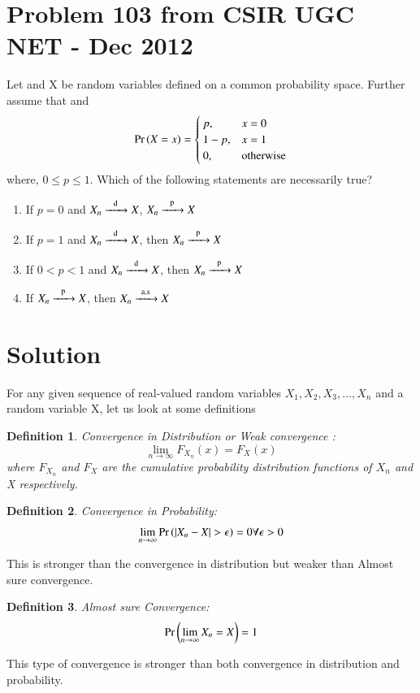 \documentclass[journal,12pt,twocolumn]{IEEEtran}
\newtheorem{definition}{Definition}
\begin{document}
\section{\textbf{Problem 103 from CSIR UGC NET - Dec 2012}}
Let  and X be random variables defined on a common probability space. Further assume that  and
 \begin{align}
\Pr\left(X = x\right) =\begin{cases}
    p, & x = 0  \\
    1-p, & x =1 \\
     0, &\text{otherwise} 
\end{cases}\end{align}
where, $0 \leq p \leq 1$. Which of the following statements are necessarily true?
\begin{enumerate}
    \item If $p = 0$ and $X_n \ce{->[d]} X$, $X_n \ce{->[p]} X$ 
    \item If $p = 1$ and $X_n \ce{->[d]} X$, then $X_n  \ce{->[p]} X$
    \item If $0<p<1$ and $X_n \ce{->[d]} X$, then $X_n \ce{->[p]} X$
    \item If $X_n \ce{->[p]} X$, then $X_n  \ce{->T[a.s]} X$
\end{enumerate}
\section{\textbf{Solution}}
For any given sequence of real-valued random variables $X_1,X_2,X_3, \dots ,X_n$ and a random variable X, let us look at some definitions
\begin{definition}{Convergence in Distribution or Weak convergence}
 \textbf{}:
    \begin{equation}
    \lim_{n \rightarrow \infty} F_{X_n}(x) = F_X(x)
\end{equation}
where $F_{X_n}$ and $F_X$ are the cumulative probability distribution functions of $X_n$ and X respectively.
\end{definition}
\begin{definition}{Convergence in Probability}:
    \begin{align}
    \lim_{n \rightarrow \infty} \Pr\left(|X_n - X| > \epsilon\right) = 0 \forall \epsilon > 0
\end{align}
\end{definition}
This is stronger than the convergence in distribution but weaker than Almost sure convergence.
\begin{definition}{Almost sure Convergence}:
    \begin{align}
  \Pr\left(\lim_{n \rightarrow \infty} X_n = X\right) = 1  
\end{align}
\end{definition}
This type of convergence is stronger than both convergence in distribution and probability.
\end{document}
